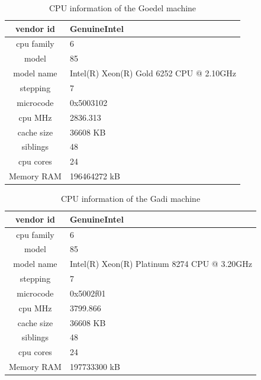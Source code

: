 \documentclass[
10pt, %
a4paper, %
oneside, %
headinclude,footinclude, %
BCOR5mm, %
]{scrartcl}
\begin{document}
\begin{table}[!ht]
\centering
\begin{tabular}{|c|p{7cm}|}
\hline
vendor id       & GenuineIntel \\\hline
cpu family      & 6 \\\hline
model           & 85 \\\hline
model name      & Intel(R) Xeon(R) Gold 6252 CPU @ 2.10GHz \\\hline
stepping        & 7 \\\hline
microcode       & 0x5003102 \\\hline
cpu MHz         & 2836.313 \\\hline
cache size      & 36608 KB \\\hline
siblings        & 48 \\\hline
cpu cores       & 24 \\\hline\hline
Memory RAM      & 196464272 kB\\\hline
\end{tabular}
\caption{CPU information of the Goedel machine}\label{cpu:goedel}
\end{table}

\begin{table}[!ht]
\centering
\begin{tabular}{|c|p{7cm}|}
\hline
vendor id       & GenuineIntel \\\hline
cpu family      & 6 \\\hline
model           & 85 \\\hline
model name      & Intel(R) Xeon(R) Platinum 8274 CPU @ 3.20GHz \\\hline
stepping        & 7 \\\hline
microcode       & 0x5002f01 \\\hline
cpu MHz         & 3799.866 \\\hline
cache size      & 36608 KB \\\hline
siblings        & 48 \\\hline
cpu cores       & 24 \\\hline\hline
Memory RAM      & 197733300 kB\\\hline
\end{tabular}
\caption{CPU information of the Gadi machine}\label{cpu:gadi}
\end{table}
\end{document}
